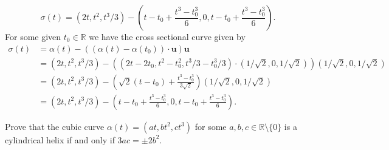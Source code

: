 \documentclass[12 pt, letterpaper]{hmcpset}
\begin{document}
\begin{solution}
\begin{enumerate}
			\[
				\boxed{
					\sigma(t) = (2t, t^{2}, t^{3}/3) - \left ( t - t_{0} + \frac{t^{3} - t_{0}^{3}}{6}, 0, t - t_{0} + \frac{t^{3} - t_{0}^{3}}{6} \right ).
				}
			\]
			For some given $t_{0} \in \mathbb{R}$ we have the cross sectional curve given by
			 \[
				\begin{split}
					\sigma(t) & = \alpha(t) - ((\alpha(t) - \alpha(t_{0})) \cdot \mathbf{u}) \mathbf{u} \\
						  & = (2t, t^{2}, t^{3}/3) - ((2t - 2t_{0}, t^{2} - t_{0}^{2}, t^{3}/3 - t_{0}^{3}/3) \cdot (1/\sqrt 2, 0, 1/\sqrt 2))(1/\sqrt 2, 0, 1/\sqrt 2) \\
						  & = (2t, t^{2}, t^{3}/3) - \left ( \sqrt 2(t - t_{0}) + \frac{t^{3} - t_{0}^{3}}{3 \sqrt 2} \right ) (1/\sqrt 2, 0, 1/\sqrt 2) \\
						  & = (2t, t^{2}, t^{3}/3) - \left ( t - t_{0} + \frac{t^{3} - t_{0}^{3}}{6}, 0, t - t_{0} + \frac{t^{3} - t_{0}^{3}}{6} \right ).
				\end{split}
			\]
	\end{enumerate}
\end{solution}

\pagebreak

\begin{problem}[Problem 5.]
	Prove that the cubic curve $\alpha(t) = (at, b t^{2}, c t^{3})$ for some $a, b, c \in \mathbb{R} \setminus \{ 0 \}$ is a cylindrical helix if and only if $3ac = \pm 2b^{2}$.
\end{problem}
\end{document}
